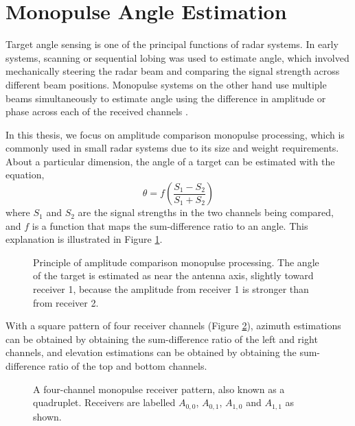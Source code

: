 \section{Monopulse Angle Estimation}
Target angle sensing is one of the principal functions of radar systems. In early systems, scanning 
or sequential lobing was used to estimate angle, which involved mechanically steering the radar 
beam and comparing the signal strength across different beam positions. Monopulse systems on the
other hand use multiple beams simultaneously to estimate angle using the difference in amplitude
or phase across each of the received channels \cite{shermanbarton2011monopulse}.

In this thesis, we focus on amplitude comparison monopulse processing, which is commonly used in 
small radar systems due to its size and weight requirements. About a particular dimension, the angle 
of a target can be estimated with the equation, 
\begin{equation}
    \theta = f\left( \frac{S_1 - S_2}{S_1 + S_2} \right)
\end{equation}
where \(S_1\) and \(S_2\) are the signal strengths in the two channels being compared, and \(f\) 
is a function that maps the sum-difference ratio to an angle. This explanation is illustrated in 
Figure \ref{fig:background_monopulse_principle}. 

\begin{figure}
    \caption[Amplitude comparison monopulse angle estimation principle.]{Principle of amplitude comparison monopulse processing. The angle of the target is
    estimated as near the antenna axis, slightly toward receiver 1, because the amplitude from receiver 1
    is stronger than from receiver 2.}
    \label{fig:background_monopulse_principle}
\end{figure}

With a square pattern of four receiver channels (Figure \ref{fig:quadruplet}), azimuth estimations can be obtained by obtaining 
the sum-difference ratio of the left and right channels, and elevation estimations can be obtained
by obtaining the sum-difference ratio of the top and bottom channels. 
\begin{figure}
    \caption[Four-channel monopulse system.]{A four-channel monopulse receiver pattern, also known as a quadruplet.
    Receivers are labelled \(A_{0,0}\), \(A_{0,1}\), \(A_{1,0}\) and \(A_{1,1}\) as shown.}
    \label{fig:quadruplet}
\end{figure}

